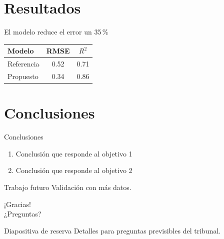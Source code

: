 \documentclass[aspectratio=169,11pt]{beamer}
\begin{document}
\section{Resultados}
\begin{frame}{El modelo reduce el error un 35\,\%}
  \centering
  \begin{tabular}{lcc}
    \toprule
    Modelo & RMSE & $R^2$ \\
    \midrule
    Referencia & \num{0.52} & \num{0.71} \\
    Propuesto  & \num{0.34} & \num{0.86} \\
    \bottomrule
  \end{tabular}
\end{frame}

\section{Conclusiones}
\begin{frame}{Conclusiones}
  \begin{enumerate}
    \item Conclusión que responde al objetivo 1
    \item Conclusión que responde al objetivo 2
  \end{enumerate}
  \vfill
  \begin{alertblock}{Trabajo futuro}
    Validación con más datos.
  \end{alertblock}
\end{frame}

\begin{frame}
  \centering\Huge ¡Gracias!\\[1em]
  \normalsize ¿Preguntas?
\end{frame}

\appendix
\begin{frame}{Diapositiva de reserva}
  Detalles para preguntas previsibles del tribunal.
\end{frame}
\end{document}
